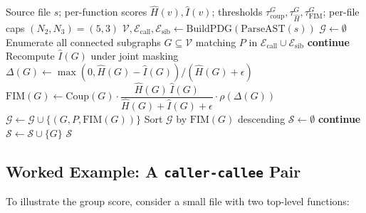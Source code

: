 \begin{algorithm}[h]
\caption{Multi-function group FIM target selection for one file.}
\label{alg:selection_multi}
\begin{algorithmic}[1]
  \Require Source file $s$; per-function scores $\hat{H}(v),\hat{I}(v)$;
           thresholds $\tau^G_{\mathrm{coup}}, \tau^G_{\hat H}, \tau^G_{\mathrm{FIM}}$;
           per-file caps $(N_2, N_3)=(5, 3)$
  \State $\mathcal{V}, \mathcal{E}_{\mathrm{call}}, \mathcal{E}_{\mathrm{sib}} \gets \mathrm{BuildPDG}(\mathrm{ParseAST}(s))$
  \State $\mathcal{G} \gets \emptyset$
    \State Enumerate all connected subgraphs $G \subseteq \mathcal{V}$ matching $P$
           in $\mathcal{E}_{\mathrm{call}}\cup\mathcal{E}_{\mathrm{sib}}$
        \State \textbf{continue}
      \EndIf
      \State Recompute $\hat{I}(G)$ under joint masking
      \State $\Delta(G) \gets \max(0, \hat{H}(G)-\hat{I}(G))/(\hat{H}(G)+\epsilon)$
      \State $\mathrm{FIM}(G) \gets \mathrm{Coup}(G)\cdot
              \dfrac{\hat{H}(G)\,\hat{I}(G)}{\hat{H}(G)+\hat{I}(G)+\epsilon}\cdot \rho(\Delta(G))$
        \State $\mathcal{G} \gets \mathcal{G} \cup \{(G,P,\mathrm{FIM}(G))\}$
      \EndIf
    \EndFor
  \EndFor
  \State Sort $\mathcal{G}$ by $\mathrm{FIM}(G)$ descending
  \State $\mathcal{S} \gets \emptyset$
      \State \textbf{continue}
    \EndIf
    \State $\mathcal{S} \gets \mathcal{S} \cup \{G\}$
  \EndFor
  \State \Return $\mathcal{S}$
\end{algorithmic}
\end{algorithm}

\subsection{Worked Example: A \texttt{caller-callee} Pair}
\label{app:algo:groups_example}

To illustrate the group score, consider a small file with two
top-level functions:


